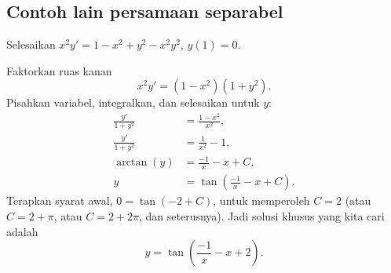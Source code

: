\subsection{Contoh lain persamaan separabel}

\begin{example}
Selesaikan $x^2y' = 1 - x^2+y^2 - x^2y^2$, $y(1) = 0$.

Faktorkan ruas kanan
\begin{equation*}
x^2y' = (1 - x^2)(1+y^2) .
\end{equation*}
Pisahkan variabel, integralkan, dan selesaikan untuk $y$:
\begin{align*}
\frac{y'}{1+y^2} & = \frac{1 - x^2}{x^2} , \\
\frac{y'}{1+y^2} & = \frac{1}{x^2} - 1 , \\
\arctan (y) & = \frac{-1}{x} - x + C , \\
y & = \tan \left(\frac{-1}{x} - x + C\right) .
\end{align*}
Terapkan syarat awal, $0 = \tan(-2+C)$, untuk memperoleh $C=2$ (atau $C = 2 +
\pi$, atau $C = 2 + 2\pi$, dan seterusnya).  Jadi solusi khusus yang kita cari adalah
\begin{equation*}
y = \tan \left(\frac{-1}{x} - x + 2 \right) .
\end{equation*}
\end{example}

